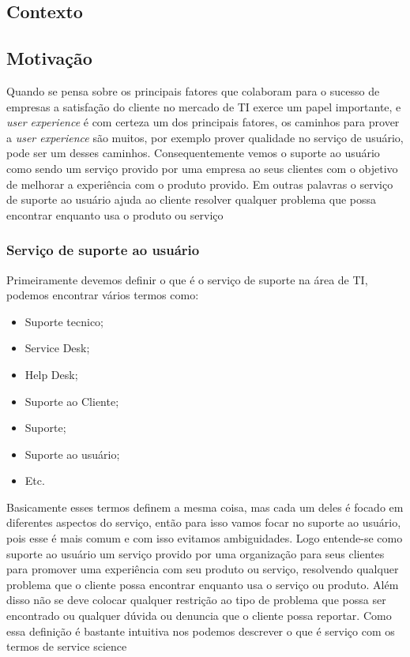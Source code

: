 \documentclass[11pt,a4paper]{article}
\begin{document}
\begin{flushleft}
\section{Contexto}

\subsection{Motivação}
Quando se pensa sobre os principais fatores que colaboram para o sucesso de
empresas a  satisfação do cliente no mercado de TI exerce um papel importante,
e \textit{user experience} é com certeza um dos principais fatores, os caminhos
para prover a \textit{user experience} são muitos, por exemplo prover qualidade
no serviço de usuário, pode ser um desses caminhos. Consequentemente vemos o
suporte ao usuário como sendo um serviço provido por uma empresa  ao seus
clientes com o objetivo de melhorar a experiência com o produto provido. Em
outras palavras o serviço de suporte ao usuário ajuda ao cliente resolver
qualquer problema que possa encontrar enquanto usa o produto ou serviço

\end{flushleft}

\subsubsection{Serviço de suporte ao usuário}
Primeiramente devemos definir o que é o serviço de suporte na área de TI,
podemos encontrar vários termos como:
\begin{itemize}[noitemsep]
  \item Suporte tecnico;
  \item Service Desk;
  \item Help Desk;
  \item Suporte ao Cliente;
  \item Suporte;
  \item Suporte ao usuário;
  \item Etc.
\end{itemize}

Basicamente esses termos definem a mesma coisa, mas cada um deles é focado
em diferentes aspectos do serviço, então para isso vamos focar no suporte
ao usuário, pois esse é mais comum e com isso evitamos ambiguidades.
Logo entende-se como suporte ao usuário um serviço provido por uma organização
para seus clientes para promover uma experiência com seu produto ou serviço,
resolvendo qualquer problema que o cliente possa encontrar enquanto usa o
serviço ou produto. Além disso não se  deve colocar qualquer restrição ao tipo
de problema que possa ser encontrado ou qualquer dúvida ou denuncia que o
cliente possa reportar.
Como essa definição é bastante intuitiva nos podemos descrever o que
é serviço com os termos de service science
\end{document}
